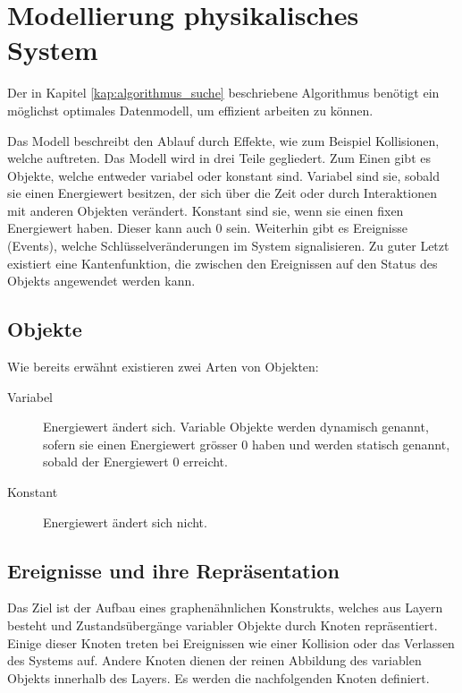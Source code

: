 \section{Modellierung physikalisches System}\label{kap:physikalisches_system}
Der in Kapitel \ref{kap:algorithmus_suche} beschriebene Algorithmus benötigt ein möglichst optimales Datenmodell,
um effizient arbeiten zu können.

Das Modell beschreibt den Ablauf durch Effekte, wie zum Beispiel Kollisionen, welche auftreten.
Das Modell wird in drei Teile gegliedert.
Zum Einen gibt es Objekte, welche entweder variabel oder konstant sind.
Variabel sind sie, sobald sie einen Energiewert besitzen, der sich über die Zeit oder durch
Interaktionen mit anderen Objekten verändert.
Konstant sind sie, wenn sie einen fixen Energiewert haben. Dieser kann auch 0 sein.
Weiterhin gibt es Ereignisse (Events), welche Schlüsselveränderungen im System signalisieren.
Zu guter Letzt existiert eine Kantenfunktion, die zwischen den Ereignissen auf den Status des Objekts angewendet werden kann.

\subsection{Objekte}
Wie bereits erwähnt existieren zwei Arten von Objekten:
\begin{description}
    \item[Variabel] Energiewert ändert sich. Variable Objekte werden dynamisch genannt, sofern sie einen Energiewert grösser
    0 haben und werden statisch genannt, sobald der Energiewert 0 erreicht.
    \item[Konstant] Energiewert ändert sich nicht.
\end{description}

\newpage
\subsection{Ereignisse und ihre Repräsentation}
Das Ziel ist der Aufbau eines graphenähnlichen Konstrukts, welches aus Layern besteht und Zustandsübergänge variabler
Objekte durch Knoten repräsentiert. Einige dieser Knoten treten bei Ereignissen wie einer Kollision oder das Verlassen des Systems
auf. Andere Knoten dienen der reinen Abbildung des variablen Objekts innerhalb des Layers. Es werden die nachfolgenden
Knoten definiert.\\

